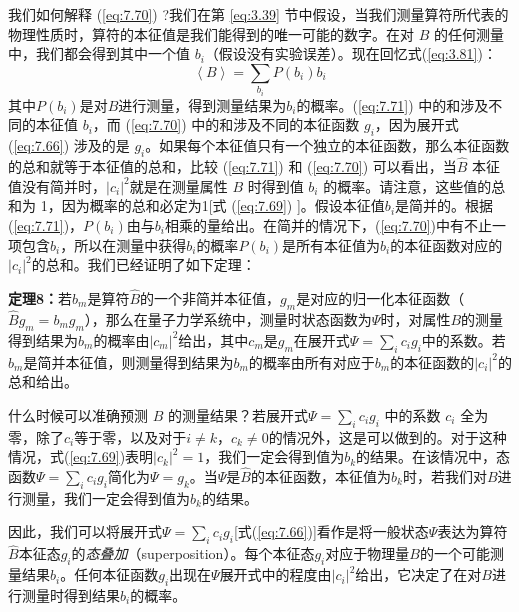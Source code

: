     我们如何解释 (\ref{eq:7.70}) ?我们在第 \ref{eq:3.39} 节中假设，当我们测量算符所代表的物理性质时，算符的本征值是我们能得到的唯一可能的数字。在对 $B$ 的任何测量中，我们都会得到其中一个值 $b_i$（假设没有实验误差）。现在回忆式(\ref{eq:3.81})：
    \begin{equation}
        \boxed{
            \left\langle B \right\rangle = \sum_{b_i}P\left(b_i\right)b_i
        }
        \label{eq:7.71}
    \end{equation}
    其中$P\left(b_i\right)$是对$B$进行测量，得到测量结果为$b_i$的概率。(\ref{eq:7.71}) 中的和涉及不同的本征值 $b_i$，而 (\ref{eq:7.70}) 中的和涉及不同的本征函数 $g_i$，因为展开式 (\ref{eq:7.66}) 涉及的是 $g_i$。如果每个本征值只有一个独立的本征函数，那么本征函数的总和就等于本征值的总和，比较 (\ref{eq:7.71}) 和 (\ref{eq:7.70}) 可以看出，当$\hat{B}$ 本征值没有简并时，$\left| c_i \right|^2$就是在测量属性 $B$ 时得到值 $b_i$ 的概率。请注意，这些值的总和为 1，因为概率的总和必定为1[式 (\ref{eq:7.69}) ]。假设本征值$b_i$是简并的。根据(\ref{eq:7.71})，$P\left(b_i\right)$由与$b_i$相乘的量给出。在简并的情况下，(\ref{eq:7.70})中有不止一项包含$b_i$，所以在测量中获得$b_i$的概率$P\left(b_i\right)$是所有本征值为$b_i$的本征函数对应的$\left| c_i \right|^2$的总和。我们已经证明了如下定理：
    \begin{center}
        \parbox{0.8\textwidth}{
            \textbf{定理8：}若$b_m$是算符$\hat{B}$的一个非简并本征值，$g_m$是对应的归一化本征函数（$\hat{B}g_m = b_mg_m$），那么在量子力学系统中，测量时状态函数为$\Psi$时，对属性$B$的测量得到结果为$b_m$的概率由$\left| c_m \right|^2$给出，其中$c_m$是$g_m$在展开式$\Psi = \sum_{i}c_i g_i$中的系数。若$b_m$是简并本征值，则测量得到结果为$b_m$的概率由所有对应于$b_m$的本征函数的$\left| c_i \right|^2$的总和给出。
        }
    \end{center}

    什么时候可以准确预测 $B$ 的测量结果？若展开式$\Psi = \sum_{i}c_i g_i$ 中的系数 $c_i$ 全为零，除了$c_i$等于零，以及对于$ i \neq k$，$c_k \neq 0$的情况外，这是可以做到的。对于这种情况，式(\ref{eq:7.69})表明$\left|c_k\right|^2=1$，我们一定会得到值为$b_k$的结果。在该情况中，态函数$\Psi = \sum_ic_i g_i$简化为$\Psi = g_k$。当$\Psi$是$\hat{B}$的本征函数，本征值为$b_k$时，若我们对$B$进行测量，我们一定会得到值为$b_k$的结果。

    因此，我们可以将展开式$\Psi = \sum_{i}c_i g_i$[式(\ref{eq:7.66})]看作是将一般状态$\Psi$表达为算符$\hat{B}$本征态$g_i$的\textit{态叠加}（superposition）。每个本征态$g_i$对应于物理量$B$的一个可能测量结果$b_i$。任何本征函数$g_i$出现在$\Psi$展开式中的程度由$\left|c_i\right|^2$给出，它决定了在对$B$进行测量时得到结果$b_i$的概率。

